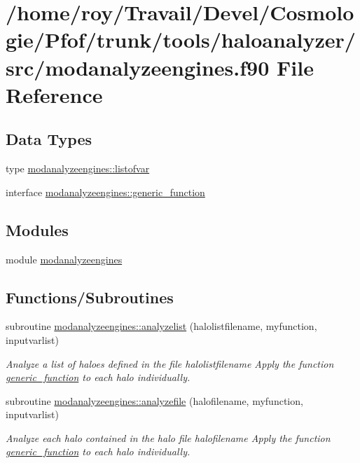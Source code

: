 \hypertarget{modanalyzeengines_8f90}{}\section{/home/roy/\+Travail/\+Devel/\+Cosmologie/\+Pfof/trunk/tools/haloanalyzer/src/modanalyzeengines.f90 File Reference}
\label{modanalyzeengines_8f90}
\subsection*{Data Types}
\begin{DoxyCompactItemize}
\item 
type \hyperlink{structmodanalyzeengines_1_1listofvar}{modanalyzeengines\+::listofvar}
\item 
interface \hyperlink{interfacemodanalyzeengines_1_1generic__function}{modanalyzeengines\+::generic\+\_\+function}
\end{DoxyCompactItemize}
\subsection*{Modules}
\begin{DoxyCompactItemize}
\item 
module \hyperlink{namespacemodanalyzeengines}{modanalyzeengines}
\end{DoxyCompactItemize}
\subsection*{Functions/\+Subroutines}
\begin{DoxyCompactItemize}
\item 
subroutine \hyperlink{namespacemodanalyzeengines_a8b4129514638c5b686e9e48dfd32fdff}{modanalyzeengines\+::analyzelist} (halolistfilename, myfunction, inputvarlist)
\begin{DoxyCompactList}\small\item\em Analyze a list of haloes defined in the file halolistfilename Apply the function \hyperlink{interfacemodanalyzeengines_1_1generic__function}{generic\+\_\+function} to each halo individually. \end{DoxyCompactList}\item 
subroutine \hyperlink{namespacemodanalyzeengines_a3d5a200a3aae5a085e6e05ede050133e}{modanalyzeengines\+::analyzefile} (halofilename, myfunction, inputvarlist)
\begin{DoxyCompactList}\small\item\em Analyze each halo contained in the halo file halofilename Apply the function \hyperlink{interfacemodanalyzeengines_1_1generic__function}{generic\+\_\+function} to each halo individually. \end{DoxyCompactList}\end{DoxyCompactItemize}
